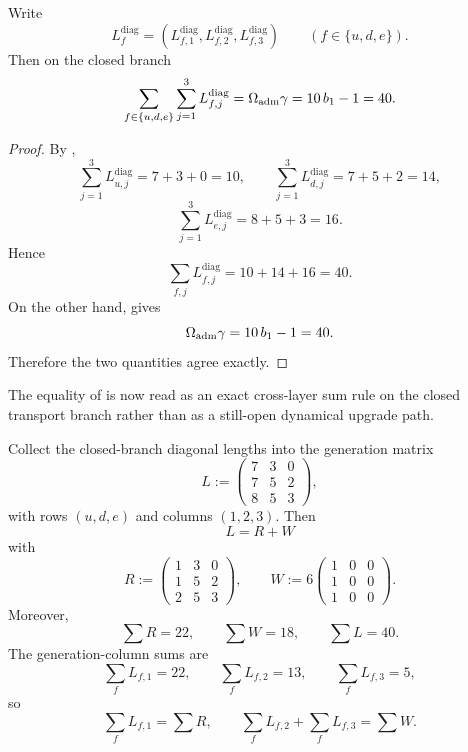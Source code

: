 \begin{corollary}
\label{cor:transport-length-sum-rule}
Write
\[
L_f^{\mathrm{diag}}=(L_{f,1}^{\mathrm{diag}},L_{f,2}^{\mathrm{diag}},L_{f,3}^{\mathrm{diag}})
\qquad
(f\in\{u,d,e\}).
\]
Then on the closed branch
\[
\sum_{f\in\{u,d,e\}}\sum_{j=1}^{3}L_{f,j}^{\mathrm{diag}}
=
\Omega_{\mathrm{adm}}\gamma
=
10\,b_1-1
=
40.
\]
\end{corollary}

\begin{proof}
By ,
\[
\sum_{j=1}^3L_{u,j}^{\mathrm{diag}}=7+3+0=10,
\qquad
\sum_{j=1}^3L_{d,j}^{\mathrm{diag}}=7+5+2=14,
\]
\[
\sum_{j=1}^3L_{e,j}^{\mathrm{diag}}=8+5+3=16.
\]
Hence
\[
\sum_{f,j}L_{f,j}^{\mathrm{diag}}=10+14+16=40.
\]
On the other hand,  gives
\[
\Omega_{\mathrm{adm}}\gamma=10\,b_1-1=40.
\]
Therefore the two quantities agree exactly.
\end{proof}

\begin{remark}
The equality of  is now read as an exact cross-layer sum
rule on the closed transport branch rather than as a still-open dynamical upgrade path.
\end{remark}

\begin{proposition}
\label{prop:transport-matrix-normal-form}
Collect the closed-branch diagonal lengths into the generation matrix
\[
L:=
\begin{pmatrix}
7&3&0\\
7&5&2\\
8&5&3
\end{pmatrix},
\]
with rows $(u,d,e)$ and columns $(1,2,3)$. Then
\[
L=R+W
\]
with
\[
R:=
\begin{pmatrix}
1&3&0\\
1&5&2\\
2&5&3
\end{pmatrix},
\qquad
W:=
6\begin{pmatrix}
1&0&0\\
1&0&0\\
1&0&0
\end{pmatrix}.
\]
Moreover,
\[
\sum R=22,
\qquad
\sum W=18,
\qquad
\sum L=40.
\]
The generation-column sums are
\[
\sum_f L_{f,1}=22,
\qquad
\sum_f L_{f,2}=13,
\qquad
\sum_f L_{f,3}=5,
\]
so
\[
\sum_f L_{f,1}=\sum R,
\qquad
\sum_f L_{f,2}+\sum_f L_{f,3}=\sum W.
\]
\end{proposition}

